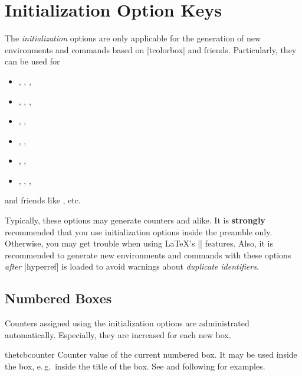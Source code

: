 \clearpage
\section{Initialization Option Keys}\label{sec:initkeys}%
%
The \emph{initialization} options are only applicable for the generation
of new environments and commands based on |tcolorbox| and friends.
Particularly, they can be used for
\begin{itemize}
\item{}, , ,
\item{}, , ,
\item{}, ,
\item{}, ,
\item{}, ,
\item{}, , ,
\end{itemize}
and friends like , etc.

\bigskip
\begin{marker}
Typically, these options may generate counters and alike.
It is \textbf{strongly} recommended that you use initialization options inside
the preamble only. Otherwise, you may get trouble when using \LaTeX's || features.
Also, it is recommended to generate new environments and commands with these
options \emph{after} |hyperref| is loaded to avoid warnings about
\emph{duplicate identifiers}.
\end{marker}


\subsection{Numbered Boxes}\label{sec:numberedboxes}
Counters assigned using the initialization options are administrated
automatically. Especially, they are increased for each new box.

\begin{docCommand}{thetcbcounter}{}
Counter value of the current numbered box. It may be used inside the box,
e.\,g.\ inside the title of
the box. See  and following for examples.
\end{docCommand}

